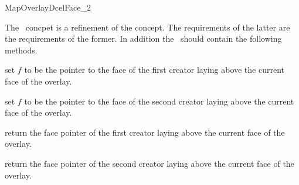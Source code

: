 
\ccRefPageBegin


\begin{ccRefConcept}{MapOverlayDcelFace_2}


The \ccRefName\ concpet is a refinement of the  concept. 
The requirements of the latter are the requirements of the former.
In addition the \ccRefName\ should contain the following methods.

  \ccOperations
  {set $f$ to be the pointer to the face of the first creator laying above the current face of the overlay.}
  
  {set $f$ to be the pointer to the face of the second creator laying above the current face of the overlay.}

  {return the face pointer of the first creator laying above the current face of the overlay.}

  {return the face pointer of the second creator laying above the current face of the overlay.}
  
\end{ccRefConcept} %

\ccRefPageEnd
